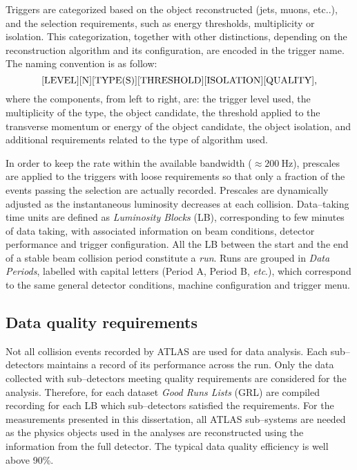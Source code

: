 Triggers are categorized based on the object reconstructed (jets,
muons, etc..), and the selection requirements, such as energy
thresholds, multiplicity or isolation. This categorization, together
with other distinctions, depending on the reconstruction algorithm and
its configuration, are encoded in the trigger name.
The naming convention is as follow:
\begin{equation*}\label{eq:}
{\rm [LEVEL][N][TYPE(S)][THRESHOLD][ISOLATION][QUALITY]},
\end{equation*}
where the components, from left to right, are: the trigger level used, the
multiplicity of the type, the object candidate, the threshold applied to
the transverse momentum or energy of the object candidate, the object
isolation, and additional requirements related to the type of algorithm used.

In order to keep the rate within the available bandwidth
($\approx{}200~\mathrm{Hz}$),  prescales are applied to the triggers
with loose requirements so that only a fraction of the events passing
the selection are actually recorded.
Prescales are dynamically adjusted as the instantaneous luminosity
decreases at each collision. Data--taking time units are defined as
{\it Luminosity Blocks} (LB), corresponding to few minutes of  data
taking, with associated information on beam conditions, detector performance 
and trigger configuration. All the LB between the start and the
end of a stable beam collision period constitute a {\it run}. Runs are grouped
in {\it Data Periods}, labelled with capital letters (Period A, Period B, {\it etc}.),
which correspond to the same general detector conditions, machine configuration and
trigger menu.

\subsection{Data quality requirements}
\label{sec:daq}

Not all collision events recorded by ATLAS are used for data analysis.
Each sub--detectors maintains a record of its performance across the
run. Only the data collected with sub--detectors meeting quality
requirements are considered for the analysis. Therefore, for each dataset
{\it Good Runs Lists} (GRL) are compiled recording for each LB which
sub--detectors satisfied the requirements.
For the measurements presented in this dissertation, all ATLAS sub--systems
are needed as the physics objects used in the analyses are reconstructed
using the information from the full detector. The typical data quality
efficiency is well above 90\%.

